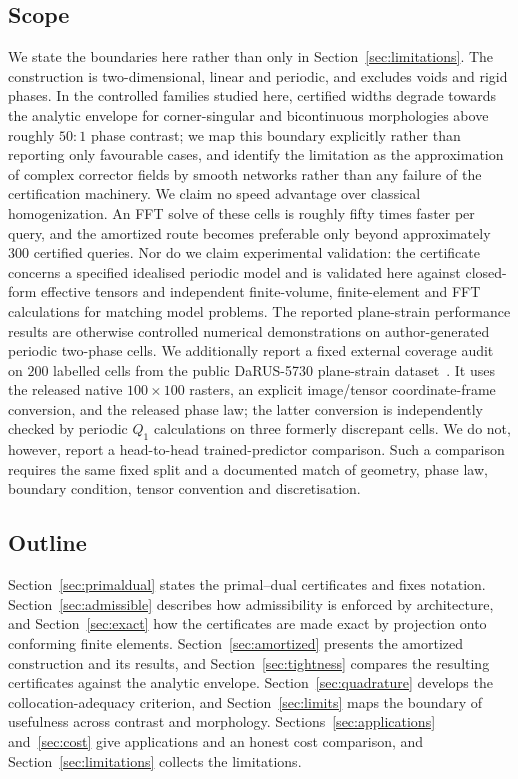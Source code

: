 \subsection{Scope}

We state the boundaries here rather than only in
Section~\ref{sec:limitations}. The construction is two-dimensional, linear
and periodic, and excludes voids and rigid phases. In the controlled
families studied here, certified widths degrade towards the analytic envelope
for corner-singular and bicontinuous morphologies above roughly $50{:}1$
phase contrast; we map this boundary explicitly rather than reporting only
favourable cases, and identify the limitation as the approximation of
complex corrector fields by smooth networks rather than any failure of the
certification machinery. We claim
no speed advantage over classical homogenization. An FFT solve of these cells is roughly fifty times faster per query, and the amortized route
becomes preferable only beyond approximately $300$ certified queries. Nor
do we claim experimental validation: the certificate concerns a specified
idealised periodic model and is validated here against closed-form effective
tensors and independent finite-volume, finite-element and FFT calculations
for matching model problems. The reported plane-strain performance results
are otherwise controlled numerical demonstrations on author-generated
periodic two-phase cells. We additionally report a fixed external coverage
audit on $200$ labelled cells from the public DaRUS-5730 plane-strain
dataset~\cite{Keshav2026data}. It uses the released native $100\times100$
rasters, an explicit image/tensor coordinate-frame conversion, and the
released phase law; the latter conversion is independently checked by
periodic $Q_1$ calculations on three formerly discrepant cells. We do not,
however, report a head-to-head trained-predictor comparison. Such a
comparison requires the same fixed split and a documented match of geometry,
phase law, boundary condition, tensor convention and discretisation.

\subsection{Outline}

Section~\ref{sec:primaldual} states the primal--dual certificates and fixes
notation. Section~\ref{sec:admissible} describes how admissibility is
enforced by architecture, and Section~\ref{sec:exact} how the certificates
are made exact by projection onto conforming finite elements.
Section~\ref{sec:amortized} presents the amortized construction and its
results, and Section~\ref{sec:tightness} compares the resulting
certificates against the analytic envelope. Section~\ref{sec:quadrature}
develops the collocation-adequacy criterion, and Section~\ref{sec:limits}
maps the boundary of usefulness across contrast and morphology.
Sections~\ref{sec:applications} and~\ref{sec:cost} give applications and an
honest cost comparison, and Section~\ref{sec:limitations} collects the
limitations.
